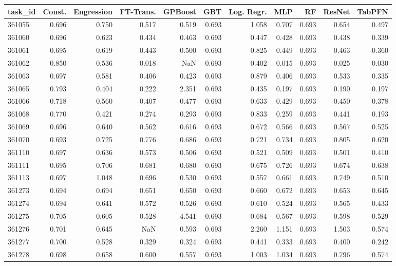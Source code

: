 \begin{tabular}{lrrrrrrrrrr}
\toprule
task\_id & Const. & Engression & FT-Trans. & GPBoost & GBT & Log. Regr. & MLP & RF & ResNet & TabPFN \\
\midrule
361055 & 0.696 & 0.750 & 0.517 & 0.519 & 0.693 & 1.058 & 0.707 & 0.693 & 0.654 & 0.497 \\
361060 & 0.696 & 0.623 & 0.434 & 0.463 & 0.693 & 0.447 & 0.428 & 0.693 & 0.438 & 0.339 \\
361061 & 0.695 & 0.619 & 0.443 & 0.500 & 0.693 & 0.825 & 0.449 & 0.693 & 0.463 & 0.360 \\
361062 & 0.850 & 0.536 & 0.018 & NaN & 0.693 & 0.402 & 0.015 & 0.693 & 0.025 & 0.030 \\
361063 & 0.697 & 0.581 & 0.406 & 0.423 & 0.693 & 0.879 & 0.406 & 0.693 & 0.533 & 0.335 \\
361065 & 0.793 & 0.404 & 0.222 & 2.351 & 0.693 & 0.435 & 0.197 & 0.693 & 0.190 & 0.197 \\
361066 & 0.718 & 0.560 & 0.407 & 0.477 & 0.693 & 0.633 & 0.429 & 0.693 & 0.450 & 0.378 \\
361068 & 0.770 & 0.421 & 0.274 & 0.293 & 0.693 & 0.833 & 0.259 & 0.693 & 0.441 & 0.193 \\
361069 & 0.696 & 0.640 & 0.562 & 0.616 & 0.693 & 0.672 & 0.566 & 0.693 & 0.567 & 0.525 \\
361070 & 0.693 & 0.725 & 0.776 & 0.686 & 0.693 & 0.721 & 0.734 & 0.693 & 0.805 & 0.620 \\
361110 & 0.697 & 0.636 & 0.573 & 0.506 & 0.693 & 0.521 & 0.509 & 0.693 & 0.501 & 0.410 \\
361111 & 0.695 & 0.706 & 0.681 & 0.680 & 0.693 & 0.675 & 0.726 & 0.693 & 0.674 & 0.638 \\
361113 & 0.697 & 1.048 & 0.696 & 0.530 & 0.693 & 0.557 & 0.661 & 0.693 & 0.749 & 0.510 \\
361273 & 0.694 & 0.694 & 0.651 & 0.650 & 0.693 & 0.660 & 0.672 & 0.693 & 0.653 & 0.645 \\
361274 & 0.694 & 0.641 & 0.572 & 0.526 & 0.693 & 0.610 & 0.524 & 0.693 & 0.565 & 0.433 \\
361275 & 0.705 & 0.605 & 0.528 & 4.541 & 0.693 & 0.684 & 0.567 & 0.693 & 0.598 & 0.529 \\
361276 & 0.701 & 0.645 & NaN & 0.593 & 0.693 & 2.260 & 1.151 & 0.693 & 1.503 & 0.574 \\
361277 & 0.700 & 0.528 & 0.329 & 0.324 & 0.693 & 0.441 & 0.333 & 0.693 & 0.400 & 0.242 \\
361278 & 0.698 & 0.658 & 0.600 & 0.557 & 0.693 & 1.003 & 1.034 & 0.693 & 0.796 & 0.574 \\

\end{tabular}
